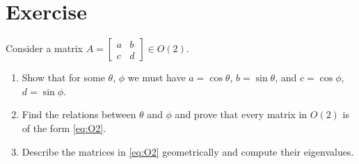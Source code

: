 \iffalse
\begin{proof}
	Suppose $\norm{p} = 1$ for some $p \in \mathbb{H}$. We need to show that for $\alpha, \beta \in \R^3$ we have $\innerp{p\alpha}{p\beta} = \innerp{\alpha}{\beta}$. We need a good way to manipulate inner products. Let $\Re(a+bi+cj+dk) = a$ denote the real part of quaternions. Then it is easy to see that $\innerp{\alpha}{\beta} = \Re(\alpha \beta)$. We're reduced to showing thatwhen $\norm{p} = 1 $ we have
	\begin{align}
		\label{eq:random}
		\Re(p \alpha p ^{-1}.p \beta p ^{-1}) = \Re{(\alpha\beta)}
	\end{align}


	Now we invoke the notion of conjugate quaternions. Similar to complex numbers we have conjugation and norm on quaternions given by
	\begin{align}
		\conj{a + bi + cj + dk}   & = a - bi - cj - dk      \\
		\norm{a + bi + cj + dk}^2 & = a^2 + b^2 + c^2 + d^2
	\end{align}
	and we also have the identity
	\begin{align}
		(a + bi + cj + dk).\conj{(a + bi + cj + dk)} = \norm{a + bi + cj + dk}^2
	\end{align}
	In particular note that if $p$ has norm 1 then $p^{-1} = \conj p$. Plugging this back in \eqref{eq:random} gives us the desired result.

	The kernel of this homomorphism is exactly the quaternions $p$ such that for all $v$ we have
	\begin{align}
		p v p ^{-1} = v
	\end{align}
	The only such $p$'s are the purely \emph{real} quaternions i.e. the ones with no $i,j,k$ components. The only such quaternions of norm 1 are $p = \pm 1$ and so the kernel of $\Phi$ is $\Z/2$.
\end{proof}
\fi



\newpage
\section{Exercise}
\begin{exercise}
	\label{thm:exO2}
	Consider a matrix $A = \begin{bmatrix} a & b \\ c & d \end{bmatrix} \in O(2)$.
	\begin{enumerate}
		\item Show that for some $\theta$, $\phi$ we must have $a = \cos \theta$, $b = \sin \theta$, and $c = \cos \phi$, $d = \sin \phi$.
		\item Find the relations between $\theta$ and $\phi$ and prove that every matrix in $O(2)$ is of the form \eqref{eq:O2}.
		\item Describe the matrices in \eqref{eq:O2} geometrically and compute their eigenvalues.
	\end{enumerate}
\end{exercise}



